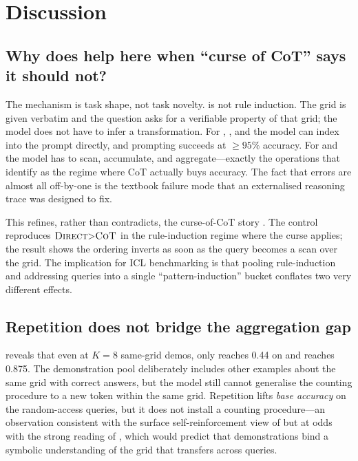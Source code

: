 \section{Discussion}
\label{sec:discussion}

\subsection{Why does \COT help here when ``curse of CoT'' says it should not?}

The mechanism is task shape, not task novelty. \addrtask is not rule
induction. The grid is given verbatim and the question asks for a
verifiable property of that grid; the model does not have to infer a
transformation. For \qpoint, \qlookup, and \qneighbor the model can
index into the prompt directly, and \Direct prompting succeeds at
$\ge 95\%$ accuracy. For \qcount and \qrowmax the model has to scan,
accumulate, and aggregate---exactly the operations that
\citet{sprague2025tocot} identify as the regime where CoT actually buys
accuracy. The fact that \Direct \qcount errors are almost all
off-by-one is the textbook failure mode that an externalised reasoning
trace was designed to fix.

This refines, rather than contradicts, the curse-of-CoT story
\citep{zheng2025curse}. The \miniarc control reproduces
$\textsc{Direct}{>}\textsc{CoT}$ in the rule-induction regime where the curse applies;
the \addrtask result shows the ordering inverts as soon as the query
becomes a scan over the grid. The implication for ICL benchmarking is
that pooling rule-induction and addressing queries into a single
``pattern-induction'' bucket conflates two very different effects.

\subsection{Repetition does not bridge the aggregation gap}

 reveals that even at $K{=}8$ same-grid demos,
\gpt \Direct only reaches 0.44 on \qcount and \haiku \Direct reaches
0.875. The demonstration pool deliberately includes other \qcount
examples about the same grid with correct answers, but the model
still cannot generalise the counting procedure to a new token within
the same grid. Repetition lifts \emph{base accuracy} on the random-access
queries, but it does not install a counting procedure---an observation
consistent with the surface self-reinforcement view of
\citet{yan2024repetitions} but at odds with the strong reading of
\citet{liu2025sparks}, which would predict that demonstrations bind a
symbolic understanding of the grid that transfers across queries.


